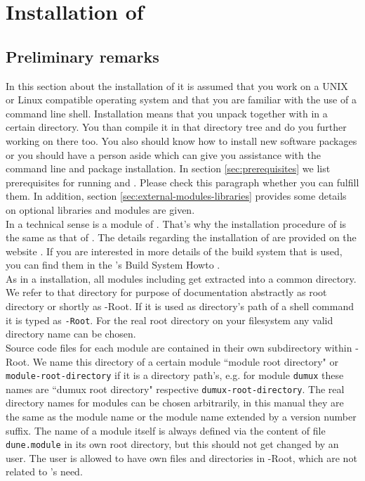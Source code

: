 \section{Installation of \Dumux} \label{install}
\subsection{Preliminary remarks}

In this section about the installation of \Dumux it is assumed that you work on a UNIX or Linux compatible operating system
and that you are familiar with the use of a command line shell. Installation means that you unpack \Dune together with \Dumux in a certain directory.
You than compile it in that directory tree and do you further working on there too. You also should know how to install new software packages
or you should have a person aside which can give you assistance with the command line and package installation. In section \ref{sec:prerequisites} we list prerequisites for running \Dune and \Dumux. 
Please check this paragraph whether you can fulfill them. In addition, section \ref{sec:external-modules-libraries} provides some details on optional libraries and modules are given. \\

In a technical sense \Dumux is a module of \Dune. 
That's why the installation procedure of \Dumux is the same as that of \Dune. 
The details regarding the installation of \Dune are provided on the \Dune website \cite{DUNE-INST}. 
If you are interested in more details of the build system that is used,
you can find them in the {\Dune}'s Build System Howto \cite{DUNE-BS}.\\


As in a \Dune installation, all \Dune modules including \Dumux get extracted into a common directory. We refer to that directory for purpose of documentation abstractly as {\Dune} root directory or shortly as {\Dune}-Root. If it is used as directory's path of a shell command it is typed as \texttt{\Dune-Root}. For the real {\Dune} root directory on your filesystem any valid directory name can be chosen.\\

Source code files for each \Dune module are contained in their own subdirectory within {\Dune}-Root.
We name this directory of a certain module ``module root directory" or \texttt{module-root-directory} if it is a directory path's,
e.g. for module \texttt{dumux} these names are  ``dumux root directory" respective \texttt{dumux-root-directory}.
The real directory names for modules can be chosen arbitrarily, in this manual they are the same as the
module name or the module name extended by a version number suffix.
The name of a \Dune module itself is always defined via the content of file \texttt{dune.module} in its own root
directory, but this should not get changed by an user. The user is allowed to have own files and directories in \Dune-Root, which are not related to \Dune's need.


